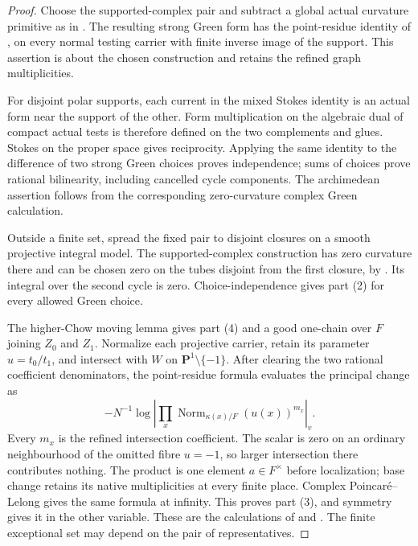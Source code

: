 \documentclass[11pt,a4paper]{article}
\theoremstyle{definition}
\numberwithin{equation}{section}
\begin{document}
\begin{proof}
Choose the supported-complex pair and subtract a global actual curvature primitive as in . The resulting strong Green form has the point-residue identity of \cite[Corollary \texttt{r16h:P}]{H16}, on every normal testing carrier with finite inverse image of the support. This assertion is about the chosen construction and retains the refined graph multiplicities.

For disjoint polar supports, each current in the mixed Stokes identity is an actual form near the support of the other. Form multiplication on the algebraic dual of compact actual tests is therefore defined on the two complements and glues. Stokes on the proper space gives reciprocity. Applying the same identity to the difference of two strong Green choices proves independence; sums of choices prove rational bilinearity, including cancelled cycle components. The archimedean assertion follows from the corresponding zero-curvature complex Green calculation.

Outside a finite set, spread the fixed pair to disjoint closures on a smooth projective integral model. The supported-complex construction has zero curvature there and can be chosen zero on the tubes disjoint from the first closure, by \cite[Theorem \texttt{r11p:complex-green} and Corollary \texttt{r11p:good-reduction-G}]{R11Green}. Its integral over the second cycle is zero. Choice-independence gives part (2) for every allowed Green choice.

The higher-Chow moving lemma \cite[Lemma 2.1]{Gorchinskiy} gives part (4) and a good one-chain over $F$ joining $Z_0$ and $Z_1$. Normalize each projective carrier, retain its parameter $u=t_0/t_1$, and intersect with $W$ on $\mathbf P^1\setminus\{-1\}$. After clearing the two rational coefficient denominators, the point-residue formula evaluates the principal change as
\[
 -N^{-1}\log\left|
 \prod_x\operatorname{Norm}_{\kappa(x)/F}(u(x))^{m_x}
 \right|_v.
\]
Every $m_x$ is the refined intersection coefficient. The scalar is zero on an ordinary neighbourhood of the omitted fibre $u=-1$, so larger intersection there contributes nothing. The product is one element $a\in F^\times$ before localization; base change retains its native multiplicities at every finite place. Complex Poincar\'e--Lelong gives the same formula at infinity. This proves part (3), and symmetry gives it in the other variable. These are the calculations of \cite[Theorem \texttt{r16h:global-height}]{H16} and \cite[Proposition \texttt{r16ph:principal-push}]{PH16}. The finite exceptional set may depend on the pair of representatives.
\end{proof}
\end{document}
